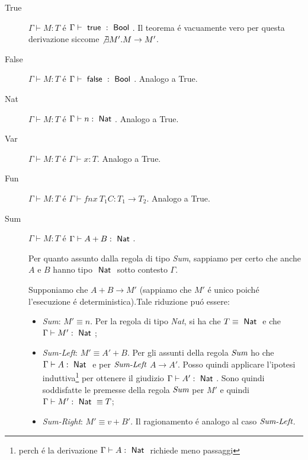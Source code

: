 
\begin{description}


 \item[True] $\Gamma \vdash{} M : T$ \'e $\Gamma \vdash{} \true{} :
  \Bool$.
  Il teorema \'e vacuamente vero per questa derivazione siccome
  $\not \exists{M'}. M \to{} M'$.
  
 \item[False]
  $\Gamma \vdash{} M : T$ \'e $\Gamma \vdash{} \false{} : \Bool$.
  Analogo a True.

\item[Nat]
  $\Gamma \vdash{} M : T$ \'e $\Gamma \vdash{} n : \Nat$. Analogo a True.

\item[Var] $\Gamma \vdash{} M : T$ \'e $\Gamma \vdash{} x : T$.
  Analogo a True.

\item[Fun] $\Gamma \vdash{} M : T$ \'e
  $\Gamma \vdash{} fn x\:T_1 C : T_1 \to{} T_2$. Analogo a True.
  
  \item[Sum]
  $\Gamma \vdash{} M : T$ \'e $\Gamma \vdash{} A + B : \Nat$.
 
  Per quanto assunto dalla regola di tipo \emph{Sum}, sappiamo per certo che
  anche $A$ e $B$ hanno tipo $\Nat$ sotto contesto $\Gamma$.

  Supponiamo che $A + B \to{} M'$ (sappiamo che $M'$ \'e unico poich\'e l'esecuzione
   \'e  deterministica).Tale riduzione pu\'o essere:

  \begin{itemize}
    \item \emph{Sum}: $M' \equiv{} n$. Per la regola di tipo
      \emph{Nat}, si ha che $T \equiv{} \Nat$ e che
      $\Gamma{} \vdash{} M' : \Nat$;
    \item \emph{Sum-Left}: $M' \equiv{} A' + B$. 
    Per gli assunti della regola $\emph{Sum}$ ho che $\Gamma \vdash A : \Nat$ e per $\emph{Sum-Left}$ $A \to A'$.
    Posso quindi applicare l'ipotesi induttiva\footnote{perch \'e  la derivazione $\Gamma \vdash A :\Nat$ richiede meno passaggi}
    per ottenere il giudizio $ \Gamma \vdash A' : \Nat$.
    Sono quindi soddisfatte le premesse della regola $\emph{Sum}$ per $M'$ e quindi  $\Gamma{} \vdash{} M' : \Nat \equiv T$;

    \item \emph{Sum-Right}: $M' \equiv{} v + B'$. Il ragionamento  \'e  analogo al caso $\emph{Sum-Left}$.
  \end{itemize}


\end{description}
